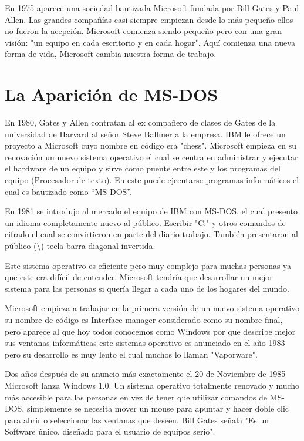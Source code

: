En 1975 aparece una sociedad bautizada Microsoft fundada por  Bill Gates y Paul Allen. Las grandes compañías casi siempre empiezan desde lo más pequeño ellos no fueron la 
acepción. Microsoft comienza siendo pequeño pero con una gran visión: "un equipo en cada escritorio y en cada hogar". Aquí comienza una nueva forma de vida, Microsoft 
cambia nuestra forma de trabajo.

\section*{La Aparición de MS-DOS}
En 1980, Gates y Allen contratan al ex compañero de clases de Gates de la universidad de Harvard al señor Steve Ballmer a la empresa. IBM le ofrece un proyecto a Microsoft 
cuyo nombre en código era "chess". Microsoft empieza en su renovación un nuevo sistema operativo el cual se centra en administrar y ejecutar el hardware de un equipo y 
sirve como puente entre este y los programas del equipo (Procesador de texto). En este puede ejecutarse programas informáticos el cual es bautizado como “MS-DOS”.

En 1981 se introdujo al mercado el equipo de IBM con MS-DOS, el cual presento un idioma completamente nuevo al público. Escribir "C:" y otros comandos de cifrado el cual se 
convirtieron en parte del diario trabajo. También presentaron al público (\textbackslash) tecla barra diagonal invertida.

Este sistema operativo es eficiente pero muy complejo para muchas personas ya que este era difícil de entender. Microsoft tendría que desarrollar un mejor sistema para las 
personas si quería llegar a cada uno de los hogares del mundo. 

Microsoft empieza a trabajar en la primera versión de un nuevo sistema operativo su nombre de código es Interface manager considerado como su nombre final, pero aparece al 
que hoy todos conocemos como Windows por que describe mejor sus ventanas informáticas este sistemas operativo es anunciado en el año 1983 pero su desarrollo es muy lento el 
cual muchos lo llaman "Vaporware".

Dos años después de su anuncio más exactamente el 20 de Noviembre de 1985 Microsoft lanza Windows 1.0. Un sistema operativo totalmente renovado y mucho más accesible para 
las personas en vez de tener que utilizar comandos de MS-DOS, simplemente se  necesita mover un mouse para apuntar y hacer doble clic para abrir o seleccionar las ventanas 
que deseen. Bill Gates señala "Es un Software único, diseñado para el usuario de equipos serio".

